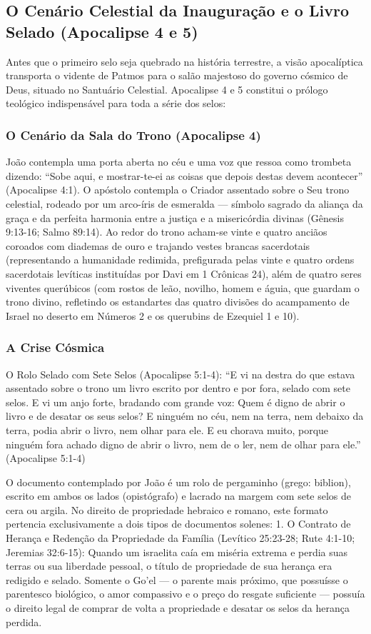 \subsection{O Cenário Celestial da Inauguração e o Livro Selado (Apocalipse 4 e 5)}


Antes que o primeiro selo seja quebrado na história terrestre, a visão apocalíptica transporta o vidente de Patmos para o salão majestoso do governo cósmico de Deus, situado no Santuário Celestial. Apocalipse 4 e 5 constitui o prólogo teológico indispensável para toda a série dos selos:


\subsubsection*{O Cenário da Sala do Trono (Apocalipse 4)}
João contempla uma porta aberta no céu e uma voz que ressoa como trombeta dizendo: ``Sobe aqui, e mostrar-te-ei as coisas que depois destas devem acontecer'' (Apocalipse 4:1). O apóstolo contempla o Criador assentado sobre o Seu trono celestial, rodeado por um arco-íris de esmeralda — símbolo sagrado da aliança da graça e da perfeita harmonia entre a justiça e a misericórdia divinas (Gênesis 9:13-16; Salmo 89:14). Ao redor do trono acham-se vinte e quatro anciãos coroados com diademas de ouro e trajando vestes brancas sacerdotais (representando a humanidade redimida, prefigurada pelas vinte e quatro ordens sacerdotais levíticas instituídas por Davi em 1 Crônicas 24), além de quatro seres viventes querúbicos (com rostos de leão, novilho, homem e águia, que guardam o trono divino, refletindo os estandartes das quatro divisões do acampamento de Israel no deserto em Números 2 e os querubins de Ezequiel 1 e 10).


\subsubsection*{A Crise Cósmica}
O Rolo Selado com Sete Selos (Apocalipse 5:1-4):
``E vi na destra do que estava assentado sobre o trono um livro escrito por dentro e por fora, selado com sete selos. E vi um anjo forte, bradando com grande voz: Quem é digno de abrir o livro e de desatar os seus selos? E ninguém no céu, nem na terra, nem debaixo da terra, podia abrir o livro, nem olhar para ele. E eu chorava muito, porque ninguém fora achado digno de abrir o livro, nem de o ler, nem de olhar para ele.'' (Apocalipse 5:1-4)

O documento contemplado por João é um rolo de pergaminho (grego: biblion), escrito em ambos os lados (opistógrafo) e lacrado na margem com sete selos de cera ou argila. No direito de propriedade hebraico e romano, este formato pertencia exclusivamente a dois tipos de documentos solenes:
1. O Contrato de Herança e Redenção da Propriedade da Família (Levítico 25:23-28; Rute 4:1-10; Jeremias 32:6-15): Quando um israelita caía em miséria extrema e perdia suas terras ou sua liberdade pessoal, o título de propriedade de sua herança era redigido e selado. Somente o Go'el — o parente mais próximo, que possuísse o parentesco biológico, o amor compassivo e o preço do resgate suficiente — possuía o direito legal de comprar de volta a propriedade e desatar os selos da herança perdida.

